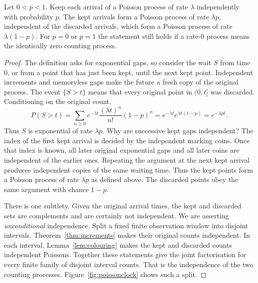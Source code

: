 \begin{theorem}[thinning]\label{thm:thinning}
Let $0<p<1$. Keep each arrival of a Poisson process of rate $\lambda$ independently with probability $p$. The kept arrivals form a Poisson process of rate $\lambda p$, independent of the discarded arrivals, which form a Poisson process of rate $\lambda(1-p)$. For $p=0$ or $p=1$ the statement still holds if a rate-$0$ process means the identically zero counting process.
\end{theorem}
\begin{proof}
The definition asks for exponential gaps, so consider the wait $S$ from time $0$, or from a point that has just been kept, until the next kept point. Independent increments and memoryless gaps make the future a fresh copy of the original process. The event $\{S>t\}$ means that every original point in $(0,t]$ was discarded. Conditioning on the original count,
\[
 P(S>t)=\sum_{n\ge0}e^{-\lambda t}\frac{(\lambda t)^n}{n!}(1-p)^n
 =e^{-\lambda t}e^{\lambda t(1-p)}=e^{-\lambda p t}.
\]
Thus $S$ is exponential of rate $\lambda p$. Why are successive kept gaps independent? The index of the first kept arrival is decided by the independent marking coins. Once that index is known, all later original exponential gaps and all later coins are independent of the earlier ones. Repeating the argument at the next kept arrival produces independent copies of the same waiting time. Thus the kept points form a Poisson process of rate $\lambda p$ as defined above. The discarded points obey the same argument with chance $1-p$.

There is one subtlety. Given the original arrival times, the kept and discarded sets are complements and are certainly not independent. We are asserting \emph{unconditional} independence. Split a fixed finite observation window into disjoint intervals. Theorem~\ref{thm:increments} makes their original counts independent. In each interval, Lemma~\ref{lem:colouring} makes the kept and discarded counts independent Poissons. Together these statements give the joint factorisation for every finite family of disjoint interval counts. That is the independence of the two counting processes. Figure~\ref{fig:poissonclock} shows such a split.
\end{proof}

